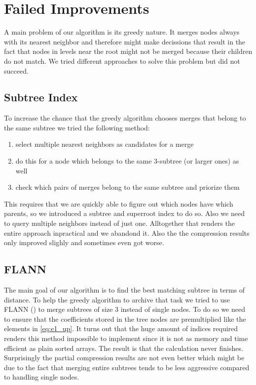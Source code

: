 \section{Failed Improvements}
\label{sec:algorithm:fail}

A main problem of our algorithm is its greedy nature. It merges nodes always with its nearest neighbor and therefore might make decissions that result in the fact that nodes in levels near the root might not be merged because their children do not match. We tried different approaches to solve this problem but did not succeed.


\subsection{Subtree Index}
\label{ssec:algorithm:fail:stindex}

To increase the chance that the greedy algorithm chooses merges that belong to the same subtree we tried the following method:

\begin{enumerate}
    \item select multiple nearest neighbors as candidates for a merge
    \item do this for a node which belongs to the same \num{3}-subtree (or larger ones) as well
    \item check which pairs of merges belong to the same subtree and priorize them
\end{enumerate}

This requires that we are quickly able to figure out which nodes have which parents, so we introduced a subtree and superroot index to do so. Also we need to query multiple neighbors instead of just one. Alltogether that renders the entire approach inpractical and we abandond it. Also the the compression results only improved slighly and sometimes even got worse.


\subsection{FLANN}
\label{ssec:algorithm:fail:flann}

The main goal of our algorithm is to find the best matching subtree in terms of distance. To help the greedy algorithm to archive that task we tried to use FLANN (\cite{FLANN}) to merge subtrees of size \num{3} instead of single nodes. To do so we need to ensure that the coefficients stored in the tree nodes are premultiplied like the elements in \autoref{eq:e1_up}. It turns out that the huge amount of indices required renders this method impossible to implement since it is not as memory and time efficient as plain sorted arrays. The result is that the calculation never finishes. Surprisingly the partial compression results are not even better which might be due to the fact that merging entire subtrees tends to be less aggressive compared to handling single nodes.


